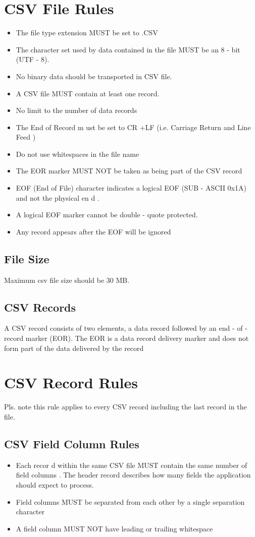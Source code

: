 \section{
CSV File Rules}\begin{itemize}\item
The file type extension MUST be set to .CSV
\item
The character set used by data contained in the file MUST be an 8
-
bit (UTF
-
8).
\item
No binary data should be transported in CSV file.
\item
A CSV file MUST contain at least one record.
\item
No limit to the number of data records
\item
The End of Record m
ust be set to
CR
+LF
(i.e. Carriage Return
and Line Feed
)
\item
Do not use whitespaces in the file name
\item
The EOR marker MUST NOT be taken as being part of the CSV record
\item
EOF  (End  of  File)
character  indicates  a  logical  EOF  (SUB
-
ASCII  0x1A)  and  not  the  physical
en
d
.
\item
A logical EOF marker cannot be double
-
quote protected.
\item
Any record appears after the EOF will be ignored
\end{itemize}
\subsection{
File Size}
Maximum csv file size
should be 30 MB.
\subsection{CSV Records}
A CSV record consists of two elements, a
data record
followed by an end
-
of
-
record marker (EOR). The
EOR is a
data record
delivery marker and does not form part of the data delivered by the record
\section{
CSV Record Rules}
Pls. note this rule applies to every CSV record including the last record in the file.
\subsection{
CSV Field Column Rules}\begin{itemize}
\item
Each  recor
d  within  the  same  CSV  file  MUST  contain  the  same  number  of  field  columns
.  The
header record describes how many fields the application should expect to process.
\item
Field columns MUST be separated from each other by a single separation character
\item
A field column
MUST NOT have leading or trailing whitespace\end{itemize}
